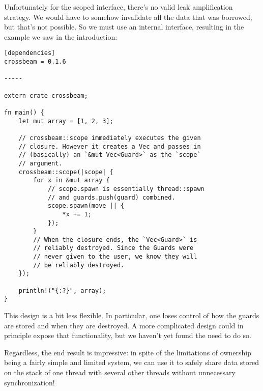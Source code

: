 Unfortunately for the scoped interface, there's no valid leak amplification strategy.
We would have to somehow invalidate all the data that was borrowed, but that's
not possible. So we must use an internal interface, resulting in the example
we saw in the introduction:

\begin{verbatim}
[dependencies]
crossbeam = 0.1.6

-----

extern crate crossbeam;

fn main() {
    let mut array = [1, 2, 3];

    // crossbeam::scope immediately executes the given
    // closure. However it creates a Vec and passes in
    // (basically) an `&mut Vec<Guard>` as the `scope`
    // argument.
    crossbeam::scope(|scope| {
        for x in &mut array {
            // scope.spawn is essentially thread::spawn
            // and guards.push(guard) combined.
            scope.spawn(move || {
                *x += 1;
            });
        }
        // When the closure ends, the `Vec<Guard>` is
        // reliably destroyed. Since the Guards were
        // never given to the user, we know they will
        // be reliably destroyed.
    });

    println!("{:?}", array);
}
\end{verbatim}

This design is a bit less flexible. In particular, one loses control of how
the guards are stored and when they are destroyed. A more complicated design
could in principle expose that functionality, but we haven't yet found the need
to do so.

Regardless, the end result is impressive: in spite of the limitations of ownership
being a fairly simple and limited system, we can use it to safely share data stored
on the stack of one thread with several other threads without unnecessary
synchronization!

